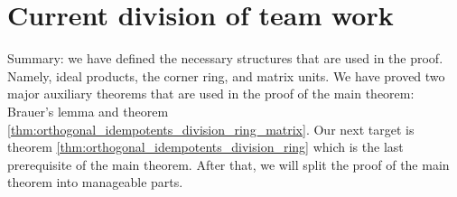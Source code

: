 %

\section{Current division of team work}

Summary: we have defined the necessary structures that are used in the proof. Namely, ideal products, the corner ring, and matrix units. We have proved two major auxiliary theorems that are used in the proof of the main theorem: Brauer's lemma and theorem \ref{thm:orthogonal_idempotents_division_ring_matrix}. Our next target is theorem \ref{thm:orthogonal_idempotents_division_ring} which is the last prerequisite of the main theorem. After that, we will split the proof of the main theorem into manageable parts.

